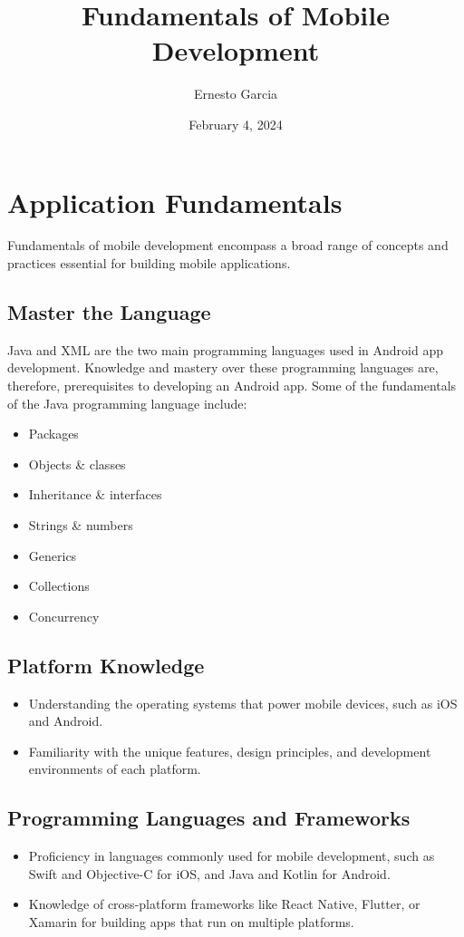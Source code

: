 \documentclass{article}
\title{Fundamentals of Mobile Development}
\author{Ernesto Garcia}
\date{February 4, 2024}
\begin{document}
\maketitle

\section{Application Fundamentals}

Fundamentals of mobile development encompass a broad range of concepts and practices essential for building mobile applications.

\subsection{Master the Language}

Java and XML are the two main programming languages used in Android app development. Knowledge and mastery over these programming languages are, therefore, prerequisites to developing an Android app. Some of the fundamentals of the Java programming language include:

\begin{itemize}
    \item Packages
    \item Objects \& classes
    \item Inheritance \& interfaces
    \item Strings \& numbers
    \item Generics
    \item Collections
    \item Concurrency
\end{itemize}

\subsection{Platform Knowledge}

\begin{itemize}
    \item Understanding the operating systems that power mobile devices, such as iOS and Android.
    \item Familiarity with the unique features, design principles, and development environments of each platform.
\end{itemize}

\subsection{Programming Languages and Frameworks}
\begin{itemize}
    \item Proficiency in languages commonly used for mobile development, such as Swift and Objective-C for iOS, and Java and Kotlin for Android.
    \item Knowledge of cross-platform frameworks like React Native, Flutter, or Xamarin for building apps that run on multiple platforms.
\end{itemize}
\end{document}
